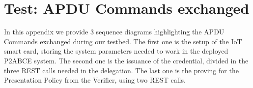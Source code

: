 \chapter{Test: APDU Commands exchanged}\label{ch:resultsdiagrams}

In this appendix we provide 3 sequence diagrams highlighting the APDU Commands exchanged during our testbed. The first one is the setup of the IoT smart card, storing the system parameters needed to work in the deployed P2ABCE system. The second one is the issuance of the credential, divided in the three REST calls needed in the delegation. The last one is the proving for the Presentation Policy from the Verifier, using two REST calls.


